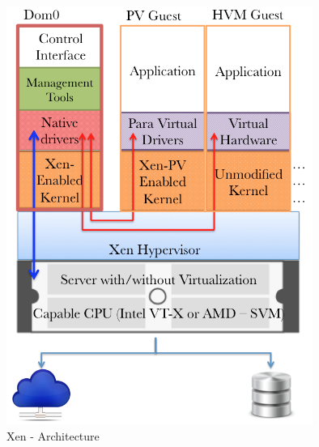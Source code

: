\begin{figure}[htbp]
\centering
\includegraphics[width=100mm]{xen-arch.png}
\caption{Xen - Architecture}
\label{xen_arch}
\end{figure}

